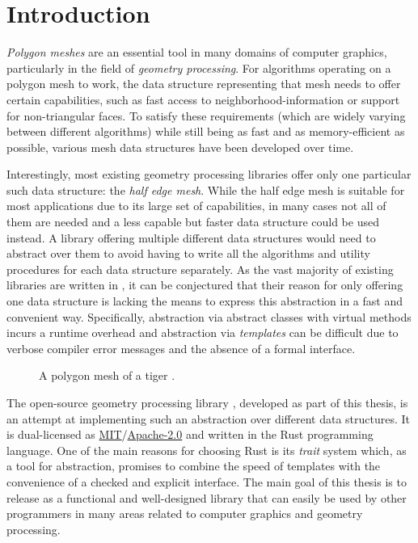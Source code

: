 \chapter{Introduction}

\emph{Polygon meshes} are an essential tool in many domains of computer graphics, particularly in the field of \emph{geometry processing}.
For algorithms operating on a polygon mesh to work, the data structure representing that mesh needs to offer certain capabilities, such as fast access to neighborhood-information or support for non-triangular faces.
To satisfy these requirements (which are widely varying between different algorithms) while still being as fast and as memory-efficient as possible, various mesh data structures have been developed over time.

Interestingly, most existing geometry processing libraries offer only one particular such data structure: the \emph{half edge mesh}.
While the half edge mesh is suitable for most applications due to its large set of capabilities, in many cases not all of them are needed and a less capable but faster data structure could be used instead.
A library offering multiple different data structures would need to abstract over them to avoid having to write all the algorithms and utility procedures for each data structure separately.
As the vast majority of existing libraries are written in \cpp, it can be conjectured that their reason for only offering one data structure is \cpp lacking the means to express this abstraction in a fast and convenient way.
Specifically, abstraction via abstract classes with virtual methods incurs a runtime overhead and abstraction via \emph{\cpp templates} can be difficult due to verbose compiler error messages and the absence of a formal interface.

\vspace{5mm}

\begin{figure}[h]
  \centering
  
  \caption{A polygon mesh of a tiger \cite{tigermodel}.}
\end{figure}

\vspace{1cm}

The open-source geometry processing library , developed as part of this thesis, is an attempt at implementing such an abstraction over different data structures.
It is dual-licensed as \hyperlink{mit}{MIT}/\hyperlink{apache2}{Apache-2.0} and written in the Rust programming language.
One of the main reasons for choosing Rust is its \emph{trait} system which, as a tool for abstraction, promises to combine the speed of \cpp templates with the convenience of a checked and explicit interface.
The main goal of this thesis is to release  as a functional and well-designed library that can easily be used by other programmers in many areas related to computer graphics and geometry processing.

